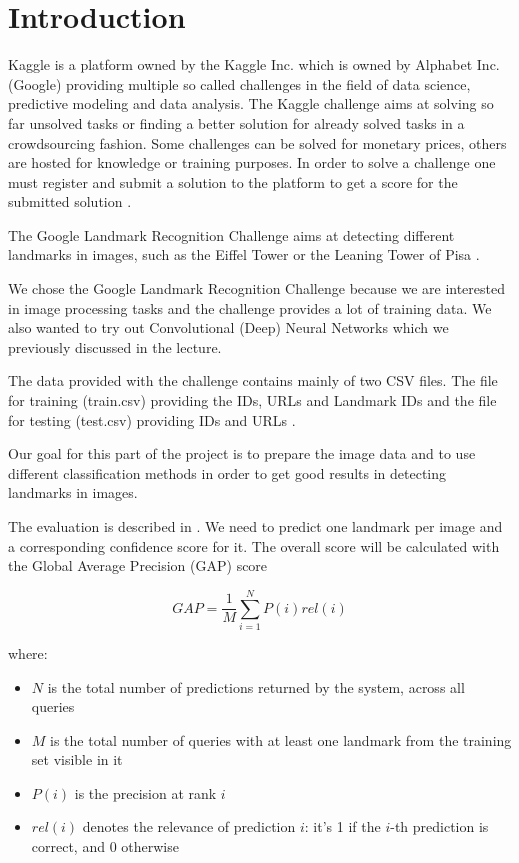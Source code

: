 \chapter{Introduction}

Kaggle is a platform owned by the Kaggle Inc. which is owned by Alphabet Inc. (Google) providing multiple so called challenges in the field of data science, predictive modeling and data analysis. The Kaggle challenge aims at solving so far unsolved tasks or finding a better solution for already solved tasks in a crowdsourcing fashion. Some challenges can be solved for monetary prices, others are hosted for knowledge or training purposes. In order to solve a challenge one must register and submit a solution to the platform to get a score for the submitted solution \cite{kaggle}.

The Google Landmark Recognition Challenge aims at detecting different landmarks in images, such as the Eiffel Tower or the Leaning Tower of Pisa \cite{challenge}.

We chose the Google Landmark Recognition Challenge because we are interested in image processing tasks and the challenge provides a lot of training data. We also wanted to try out Convolutional (Deep) Neural Networks which we previously discussed in the lecture.

The data provided with the challenge contains mainly of two CSV files. The file for training (train.csv) providing the IDs, URLs and Landmark IDs and the file for testing (test.csv) providing IDs and URLs \cite{data}.

Our goal for this part of the project is to prepare the image data and to use different classification methods in order to get good results in detecting landmarks in images.

The evaluation is described in \cite{evaluation}. We need to predict one landmark per image and a corresponding confidence score for it. The overall score will be calculated with the Global Average Precision (GAP) score

\[GAP = \frac{1}{M}\sum_{i=1}^{N}P(i)rel(i)\]

where:\\

\begin{itemize}
	\item $N$ is the total number of predictions returned by the system, across all queries
	\item $M$ is the total number of queries with at least one landmark from the training set visible in it
	\item $P(i)$ is the precision at rank $i$
	\item $rel(i)$ denotes the relevance of prediction $i$: it's 1 if the $i$-th prediction is correct, and 0 otherwise
\end{itemize}

